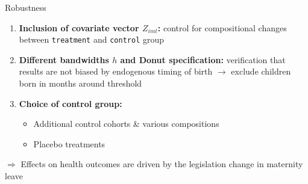 \documentclass{beamer} %
\begin{document}
\begin{frame}{Robustness}

\begin{enumerate}
\item \textbf{Inclusion of covariate vector $Z_{imt}$:} control for compositional changes between \texttt{treatment} and \texttt{control} group 
\item \textbf{Different bandwidths $h$ and Donut specification:} verification that results are not biased by endogenous timing of birth $\rightarrow$ exclude children born in months around threshold
\item \textbf{Choice of control group:} 
\begin{itemize}
\item Additional control cohorts \& various compositions
\item Placebo treatments
\end{itemize}
\end{enumerate}

$\Rightarrow$ Effects on health outcomes are driven by the legislation change in maternity leave

\end{frame}




\end{document}
